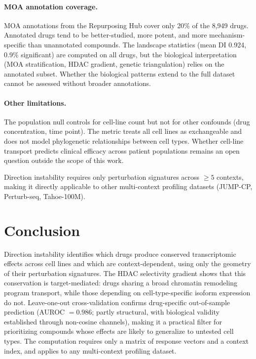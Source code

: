 \documentclass[11pt]{article}
\begin{document}
\paragraph{MOA annotation coverage.}
MOA annotations from the Repurposing Hub cover only 20\% of the 8{,}949
drugs.  Annotated drugs tend to be better-studied, more potent, and more
mechanism-specific than unannotated compounds.  The landscape statistics
(mean DI 0.924, 0.9\% significant) are computed on all drugs, but the
biological interpretation (MOA stratification, HDAC gradient, genetic
triangulation) relies on the annotated subset.  Whether the biological
patterns extend to the full dataset cannot be assessed without
broader annotations.

\paragraph{Other limitations.}
The population null controls for cell-line count but not for other
confounds (drug concentration, time point).  The metric treats all cell
lines as exchangeable and does not model phylogenetic relationships
between cell types.  Whether cell-line transport predicts clinical
efficacy across patient populations remains an open question outside the
scope of this work.

Direction instability requires only perturbation signatures across
$\geq5$ contexts, making it directly applicable to other multi-context
profiling datasets (JUMP-CP, Perturb-seq, Tahoe-100M).

\section{Conclusion}

Direction instability identifies which drugs produce conserved
transcriptomic effects across cell lines and which are
context-dependent, using only the geometry of their perturbation
signatures. The HDAC selectivity gradient shows that this conservation
is target-mediated: drugs sharing a broad chromatin remodeling program
transport, while those depending on cell-type-specific isoform
expression do not. Leave-one-out cross-validation confirms drug-specific
out-of-sample prediction (AUROC $= 0.986$; partly structural, with
biological validity established through non-cosine channels), making it
a practical filter for prioritizing compounds whose effects are likely
to generalize to untested cell types. The computation requires only a
matrix of response vectors and a context index, and applies to any
multi-context profiling dataset.
\end{document}
